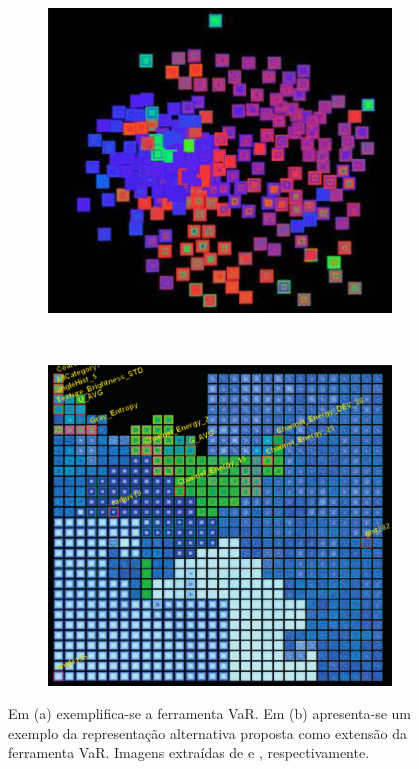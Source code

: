 \begin{figure}[h!]
  \centering
  \begin{subfigure}[b]{0.5\textwidth}
    \centering
    \includegraphics[width=\textwidth]{images/var1.png}
    \caption{}
    \label{fig:var1}
  \end{subfigure}%
  ~ %
  \begin{subfigure}[b]{0.475\textwidth}
    \centering
    \includegraphics[width=\textwidth]{images/var2.png}
    \caption{}
    \label{fig:var2}
  \end{subfigure}
  \caption[VaR: Value and Relation]
      {Em (a) exemplifica-se a ferramenta VaR. Em (b)
          apresenta-se um exemplo da representação
          alternativa proposta como extensão da ferramenta
          VaR. Imagens extraídas de \cite{Yang2004} e
      \cite{Yang2007}, respectivamente.}
\end{figure}

